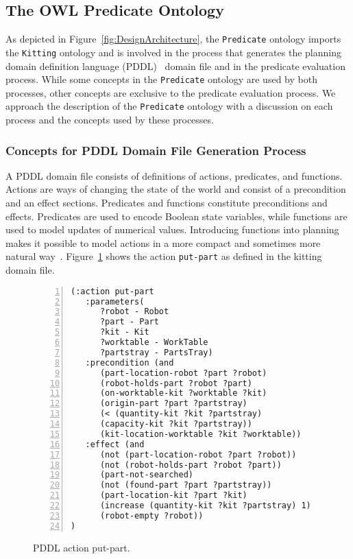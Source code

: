 \subsection{The OWL Predicate Ontology}\label{owlsoap}

As depicted in Figure~\ref{fig:DesignArchitecture}, the \texttt{Predicate} ontology imports the \texttt{Kitting} ontology and is involved in the process that generates the planning domain definition language (PDDL)~\cite{GHALLAB.PDDL.1998} domain file and in the predicate evaluation process. While some concepts in the \texttt{Predicate} ontology are used by both processes, other concepts are exclusive to the predicate evaluation process. We approach the description of the \texttt{Predicate} ontology with a discussion on each process and the concepts used by these processes.

\subsubsection{Concepts for PDDL Domain File Generation Process}\label{sss:domainfile}
A PDDL domain file consists of definitions of actions, predicates, and functions. Actions are ways of changing the state of the world and consist of a precondition and an effect sections. Predicates and functions constitute preconditions and effects. Predicates are used to encode Boolean state variables, while functions are used to model updates of numerical values. Introducing functions into planning makes it possible to model actions in a more compact and sometimes more natural way~\cite{FOX.JAIR.2003}. Figure~\ref{fig:put-part} shows the action \texttt{put-part} as defined in the kitting domain file.

\begin{figure}[t!h!]
    \begin{minipage}{.9\paperwidth}
    \begin{mylisting}
    \begin{Verbatim}[commandchars=\\\{\},fontsize=\small, numbers=left, numbersep=0pt]
(:action put-part
   :parameters(
      ?robot - Robot
      ?part - Part
      ?kit - Kit
      ?worktable - WorkTable
      ?partstray - PartsTray)
   :precondition (and
      (part-location-robot ?part ?robot)
      (robot-holds-part ?robot ?part)
      (on-worktable-kit ?worktable ?kit)
      (origin-part ?part ?partstray)
      (< (quantity-kit ?kit ?partstray)
      (capacity-kit ?kit ?partstray))
      (kit-location-worktable ?kit ?worktable))
   :effect (and
      (not (part-location-robot ?part ?robot))
      (not (robot-holds-part ?robot ?part))
      (part-not-searched)
      (not (found-part ?part ?partstray))
      (part-location-kit ?part ?kit)
      (increase (quantity-kit ?kit ?partstray) 1)
      (robot-empty ?robot))
)
\end{Verbatim}
\end{mylisting}
\end{minipage}
\caption{PDDL action put-part.}
\label{fig:put-part}
\end{figure}

